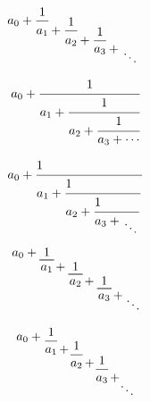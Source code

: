 \documentclass{article}
\begin{document}
	\newcommand*{\cofrac}[2]{%
		{%
			\rlap{$\dfrac{1}{\phantom{#1}}$}%
			\genfrac{}{}{0pt}{0}{}{#1+#2}%
		}%
	}
	\[
	a_0 +
	\cofrac{a_1}{
		\cofrac{a_2}{
			\cofrac{a_3}{
				\genfrac{}{}{0pt}{0}{}{\ddots}
	}}}
	\]
	
	\begin{equation*}
		a_0+\cfrac{1}{a_1+\cfrac{1}{a_2+\cfrac{1}{a_3+\cdots}}}
	\end{equation*}

	\def\cof#1{\displaystyle{1\strut\hfill\over #1}}
	$$ a_0 + \cof{a_1 + \cof{a_2 + \cof{a_3 + {\atop\ddots}}}} $$
	
	\newcommand*{\underBracket}[2][1]{\underbracket[.6pt][0pt]{~#1\vphantom{g}~}_{\displaystyle #2\vphantom{g+1}}}
	\begin{equation}
		a_0 + \underBracket{a_1\mathrlap{{}+ \underBracket{a_2\mathrlap{{} + \underBracket{a_3\mathrlap{{}+{}\raise-2.2ex\hbox{$\smash\ddots$}}}}}}}
		\hphantom{a_1 + a_2 + a_3 + {}} %
	\end{equation}

	\[
	a_0+
		\raisebox{-.25\height}{$\dfrac{1}{a_1\mathrlap{\,+}}$}\mkern15mu
		\raisebox{-1.1\height}{$\dfrac{1}{a_2\mathrlap{\,+}}$}\mkern15mu
		\raisebox{-2.0\height}{$\dfrac{1}{a_3\mathrlap{\,+}}$}\mkern15mu
		\raisebox{-3\height}{$\ddots$}
	\]
\end{document}
